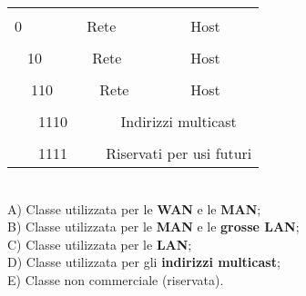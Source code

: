 \documentclass{article}
\begin{document}
            
            \begin{tabular}{|l|l|l|l|l|l|l|l|l|l|l|l|l|l|l|l|l|l|l|l|l|l|l|l|l|l|l|l|l|l|l|l|}
                \hline
                & & & & & & & & & & & & & & & & & & & & & & & & & & & & & & & \\
                \hline
                \multicolumn{32}{l}{} \\
                \hline
                0 & \multicolumn{7}{|c|}{Rete} & \multicolumn{24}{|c|}{Host} \\
                \hline
                \multicolumn{32}{l}{} \\
                \hline
                \multicolumn{2}{|c|}{10} & \multicolumn{14}{|c|}{Rete} & \multicolumn{16}{|c|}{Host} \\
                \hline
                \multicolumn{32}{l}{} \\
                \hline
                \multicolumn{3}{|c|}{110} & \multicolumn{21}{|c|}{Rete} & \multicolumn{8}{|c|}{Host} \\
                \hline
                \multicolumn{32}{l}{} \\
                \hline
                \multicolumn{4}{|c|}{1110} & \multicolumn{28}{|c|}{Indirizzi multicast} \\
                \hline
                \multicolumn{32}{l}{} \\
                \hline
                \multicolumn{4}{|c|}{1111} & \multicolumn{28}{|c|}{Riservati per usi futuri} \\
                \hline
            \end{tabular}\\
            
            A) Classe utilizzata per le \textbf{WAN} e le \textbf{MAN};\\
            B) Classe utilizzata per le \textbf{MAN} e le \textbf{grosse LAN};\\
            C) Classe utilizzata per le \textbf{LAN};\\
            D) Classe utilizzata per gli \textbf{indirizzi multicast};\\
            E) Classe non commerciale (riservata).
\end{document}
